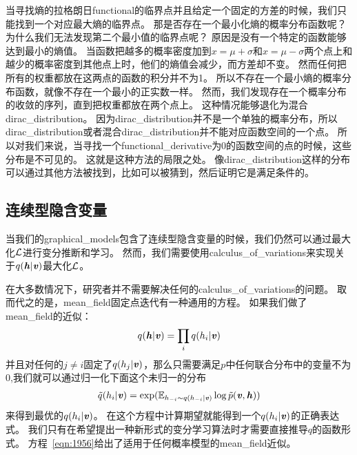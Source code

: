 当寻找熵的拉格朗日\gls{functional}的临界点并且给定一个固定的方差的时候，我们只能找到一个对应最大熵的临界点。
那是否存在一个最小化熵的概率分布函数呢？
为什么我们无法发现第二个最小值的临界点呢？
原因是没有一个特定的函数能够达到最小的熵值。
当函数把越多的概率密度加到$x = \mu + \sigma$和$x = \mu - \sigma$两个点上和越少的概率密度到其他点上时，他们的熵值会减少，而方差却不变。
然而任何把所有的权重都放在这两点的函数的积分并不为1。
所以不存在一个最小熵的概率分布函数，就像不存在一个最小的正实数一样。
然而，我们发现存在一个概率分布的收敛的序列，直到把权重都放在两个点上。
这种情况能够退化为混合\gls{dirac_distribution}。
因为\gls{dirac_distribution}并不是一个单独的概率分布，所以\gls{dirac_distribution}或者混合\gls{dirac_distribution}并不能对应函数空间的一个点。
所以对我们来说，当寻找一个\gls{functional_derivative}为0的函数空间的点的时候，这些分布是不可见的。
这就是这种方法的局限之处。
像\gls{dirac_distribution}这样的分布可以通过其他方法被找到，比如可以被猜到，然后证明它是满足条件的。



\subsection{连续型隐含变量}
\label{sec:continuous_latent_variables}


当我们的\gls{graphical_models}包含了连续型隐含变量的时候，我们仍然可以通过最大化$\mathcal{L}$进行变分推断和学习。
然而，我们需要使用\gls{calculus_of_variations}来实现关于$q(\boldsymbol{\mathit{h}}\vert\boldsymbol{\mathit{v}})$最大化$\mathcal{L}$。


在大多数情况下，研究者并不需要解决任何的\gls{calculus_of_variations}的问题。
取而代之的是，\gls{mean_field}固定点迭代有一种通用的方程。
如果我们做了\gls{mean_field}的近似：
\begin{align}
\label{eqn:1955}
	q(\boldsymbol{\mathit{h}}\vert\boldsymbol{\mathit{v}}) = \prod_i q(h_i \vert\boldsymbol{\mathit{v}})
\end{align}
并且对任何的$j\neq i$固定了$q(h_j\vert\boldsymbol{\mathit{v}})$，那么只需要满足$p$中任何联合分布中的变量不为0,我们就可以通过归一化下面这个未归一的分布
\begin{align}
	\label{eqn:1956}
	\tilde{q}(h_i \vert\boldsymbol{\mathit{v}}) = \exp
	(\mathbb{E}_{h_{-i}\sim q(h_{-i}\vert\boldsymbol{\mathit{v}})}
	\log \tilde{p}(\boldsymbol{\mathit{v}},\boldsymbol{\mathit{h}}))
\end{align}
来得到最优的$q(h_i\vert\boldsymbol{\mathit{v}})$。
在这个方程中计算期望就能得到一个$q(h_i\vert\boldsymbol{\mathit{v}})$的正确表达式。
我们只有在希望提出一种新形式的变分学习算法时才需要直接推导$q$的函数形式。
方程~\eqref{eqn:1956}给出了适用于任何概率模型的\gls{mean_field}近似。




